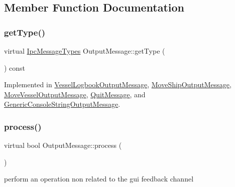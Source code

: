\subsection{Member Function Documentation}
\mbox{\label{class_output_message_adfc965910862cd236e437e3050aee176}} 
\subsubsection{\texorpdfstring{getType()}{getType()}}
{\footnotesize\ttfamily virtual \mbox{\hyperlink{ipcmsgtypes_8h_a59f75a61492e64aebfae0cc49cc26683}{Ipc\+Message\+Types}} Output\+Message\+::get\+Type (\begin{DoxyParamCaption}{ }\end{DoxyParamCaption}) const\hspace{0.3cm}{\ttfamily [pure virtual]}}



Implemented in \mbox{\hyperlink{class_vessel_logbook_output_message_a2fadf88d13091f268a7a443bc3638c6c}{Vessel\+Logbook\+Output\+Message}}, \mbox{\hyperlink{class_move_ship_output_message_ae90a05ef8c71c5d5d0c2be4b5b540b9b}{Move\+Ship\+Output\+Message}}, \mbox{\hyperlink{class_move_vessel_output_message_a8f31dbcf29eb889a5217abc82f501b4d}{Move\+Vessel\+Output\+Message}}, \mbox{\hyperlink{class_quit_message_aacd6dd8d6b63c685151bfd54c1edc990}{Quit\+Message}}, and \mbox{\hyperlink{class_generic_console_string_output_message_a80cb535bea64b33a076b6207356a7c3c}{Generic\+Console\+String\+Output\+Message}}.

\mbox{\label{class_output_message_a949d8350d98202608e4248fe6dafa10f}} 
\subsubsection{\texorpdfstring{process()}{process()}}
{\footnotesize\ttfamily virtual bool Output\+Message\+::process (\begin{DoxyParamCaption}{ }\end{DoxyParamCaption})\hspace{0.3cm}{\ttfamily [pure virtual]}}



perform an operation non related to the gui feedback channel 

